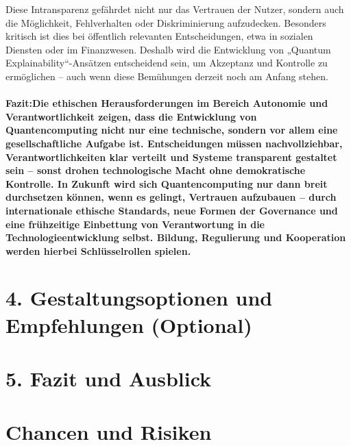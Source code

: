 Diese Intransparenz gefährdet nicht nur das Vertrauen der Nutzer, sondern auch die Möglichkeit, Fehlverhalten oder Diskriminierung aufzudecken. Besonders kritisch ist dies bei öffentlich relevanten Entscheidungen, etwa in sozialen Diensten oder im Finanzwesen. Deshalb wird die Entwicklung von „Quantum Explainability“-Ansätzen entscheidend sein, um Akzeptanz und Kontrolle zu ermöglichen – auch wenn diese Bemühungen derzeit noch am Anfang stehen.

 
\paragraph{Fazit:Die ethischen Herausforderungen im Bereich \textbf{Autonomie und Verantwortlichkeit} zeigen, dass die Entwicklung von Quantencomputing nicht nur eine technische, sondern vor allem eine gesellschaftliche Aufgabe ist. Entscheidungen müssen nachvollziehbar, Verantwortlichkeiten klar verteilt und Systeme transparent gestaltet sein – sonst drohen technologische Macht ohne demokratische Kontrolle.
 In Zukunft wird sich Quantencomputing nur dann breit durchsetzen können, wenn es gelingt, Vertrauen aufzubauen – durch internationale ethische Standards, neue Formen der Governance und eine frühzeitige Einbettung von Verantwortung in die Technologieentwicklung selbst. Bildung, Regulierung und Kooperation werden hierbei Schlüsselrollen spielen.}

 

 
 

 

\section{4. Gestaltungsoptionen und Empfehlungen (Optional)}

\section{5. Fazit und Ausblick}





















\section{Chancen und Risiken}

